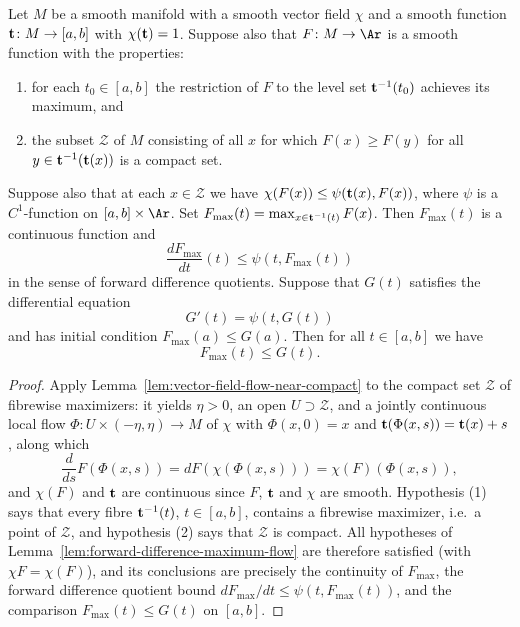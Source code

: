 \begin{proposition}
\label{prop:forward-difference-maximum}
\label{fordiffmax}
\leanok
{}
Let $M$ be a smooth manifold with a smooth vector field $\chi$ and a
smooth function ${\bf t}\colon M\to [a,b]$ with $\chi({\bf t})=1$.
Suppose also that $F\colon M\to \Ar$ is a smooth function with the
properties:
\begin{enumerate}
\item for each $t_0\in [a,b]$ the restriction of $F$ to the level set ${\bf
t}^{-1}(t_0)$ achieves its maximum, and \item the subset ${\mathcal Z}$ of $M$
consisting of all $x$ for which $F(x)\ge F(y)$ for all $y\in {\bf t}^{-1}({\bf
t}(x))$ is a compact set.
\end{enumerate}
Suppose also that at each $x\in {\mathcal Z}$ we have $\chi(F(x))\le \psi({\bf
t}(x),F(x))$, where $\psi$ is a $C^1$-function on $[a,b]\times\Ar$. Set $F_{\mathrm{max}}(t)=\max_{x\in {\bf
t}^{-1}(t)}F(x)$. Then $F_{\mathrm{max}}(t)$ is a continuous function and
$$\frac{dF_{\mathrm{max}}}{dt}(t)\le \psi(t,F_{\mathrm{max}}(t))$$
in the sense of forward difference quotients.
Suppose that $G(t)$ satisfies the
differential equation
$$G'(t)=\psi(t,G(t))$$ and has initial condition $F_{\mathrm{max}}(a)\le G(a)$. Then for all $t\in [a,b]$ we have
$$F_{\mathrm{max}}(t)\le G(t).$$
\end{proposition}

\begin{proof}
\leanok
{}
Apply Lemma~\ref{lem:vector-field-flow-near-compact} to the compact set
${\mathcal Z}$ of fibrewise maximizers: it yields $\eta>0$, an open
$U\supset{\mathcal Z}$, and a jointly continuous local flow
$\Phi\colon U\times(-\eta,\eta)\to M$ of $\chi$ with $\Phi(x,0)=x$ and
${\bf t}(\Phi(x,s))={\bf t}(x)+s$, along which
$$\frac{d}{ds}F(\Phi(x,s))=dF\left(\chi(\Phi(x,s))\right)
=\chi(F)\left(\Phi(x,s)\right),$$
and $\chi(F)$ and ${\bf t}$ are continuous since $F$, ${\bf t}$ and
$\chi$ are smooth. Hypothesis (1) says that every fibre
${\bf t}^{-1}(t)$, $t\in[a,b]$, contains a fibrewise maximizer, i.e.\ a
point of ${\mathcal Z}$, and hypothesis (2) says that ${\mathcal Z}$ is
compact. All hypotheses of
Lemma~\ref{lem:forward-difference-maximum-flow} are therefore satisfied
(with $\chi F=\chi(F)$), and its conclusions are precisely the
continuity of $F_{\mathrm{max}}$, the forward difference quotient bound
$dF_{\mathrm{max}}/dt\le\psi(t,F_{\mathrm{max}}(t))$, and the comparison
$F_{\mathrm{max}}(t)\le G(t)$ on $[a,b]$.
\end{proof}

